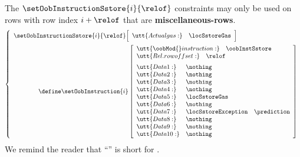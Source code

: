 \saNote{} The $\setOobInstructionSstore {i}{\relof}$ constraints may only be used on rows with row index $i + \relof$ that are \textbf{miscellaneous-rows}.
\[
        \left\{ \begin{array}{l}
                \setOobInstructionSstore {i}{\relof}
                \Big[ \begin{array}{ll}
                        \utt{Actual gas:} & \locSstoreGas  \\
                \end{array} \Big] \vspace{2mm} \\
                \qquad \qquad \define
                \setOobInstruction{i}
                \left[ \begin{array}{llr}
                        \multicolumn{3}{l}{\utt{\oobMod{} instruction:} \quad \oobInstSstore} \\
                        \multicolumn{3}{l}{\utt{Rel. row offset:}            \quad \relof}         \vspace{2mm} \\
                        \utt{Data 1:}  & \nothing            \\
                        \utt{Data 2:}  & \nothing            \\
                        \utt{Data 3:}  & \nothing            \\
                        \utt{Data 4:}  & \nothing            \\
                        \utt{Data 5:}  & \locSstoreGas       \\
                        \utt{Data 6:}  & \nothing            \\
                        \utt{Data 7:}  & \locSstoreException & \prediction \\
                        \utt{Data 8:}  & \nothing            \\
                        \utt{Data 9:}  & \nothing            \\
                        \utt{Data 10:} & \nothing            \\
                \end{array} \right] \\
        \end{array} \right.
\]
\saNote{} We remind the reader that ``\sstorex'' is short for \sstorexSH{}.
